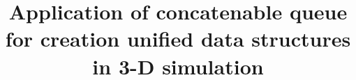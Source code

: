 \documentclass[sigconf]{acmart}
\begin{document}
\title{Application of concatenable queue for creation unified data structures in 3-D simulation}










\end{document}
